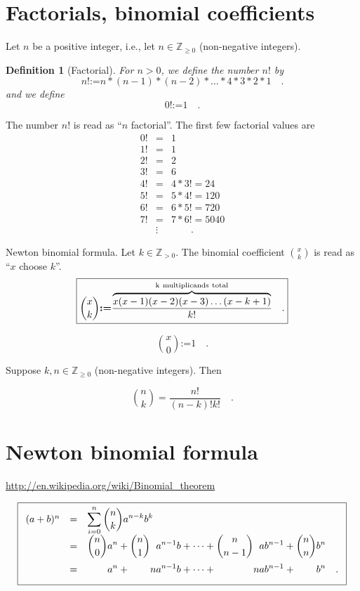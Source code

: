 \documentclass[12pt]{book}
\newcommand{\eqdef}{\textbf{:=}}
\newcommand{\importantFormula}[1]{\begin{equation} \boxed{#1} \end{equation}}
\newtheorem{definition}[theorem]{Definition}
\begin{document}
\section{Factorials, binomial coefficients}\label{secFactorial}
Let $n$ be a positive integer, i.e., let $n \in \mathbb Z_{\geq 0}$ (non-negative integers).
\begin{definition}[Factorial] 
For $n>0$, we define the number $n!$ by
\[
n!\eqdef n*(n-1)*(n-2)*\dots *4*3*2*1 \quad  .
\]
and we define
\[
0!\eqdef 1\quad .
\]
\end{definition}
The number $n!$ is read as ``$n$ factorial''. The first few factorial values are
\[\begin{array}{rcl}
0!&=&1\\
1!&=&1\\
2!&=&2\\
3!&=&6\\
4!&=&4*3!=24\\
5!&=&5*4!=120\\
6!&=&6*5!=720\\
7!&=&7*6!=5040  \\
&\vdots&\quad \quad .
\end{array}
\]

 Newton binomial formula.
 Let $k\in \mathbb Z_{>0}$. The binomial coefficient $\binom{x}{k}$ is read as ``$x$ choose $k$''.
\importantFormula{\label{eqBinomialCoeffDefinition}
\binom{x}{k}\eqdef \frac{ \overbrace{ x(x-1)(x-2)(x-3)\dots (x-k+1)}^{\mathrm{k~multiplicands~total}} } {k!} \quad .
}

\[\binom{x}{0}\eqdef 1 \quad .
\]

Suppose $k,n\in \mathbb Z_{\geq 0}$ (non-negative integers). Then

\[\binom{n}{k} = \frac{n!}{(n-k)! k!}\quad .
\]

\section{Newton binomial formula}\label{secNewtonBinomialReview}
\url{http://en.wikipedia.org/wiki/Binomial_theorem}



\importantFormula{\label{eqNewtonBinomialFormula}
\begin{array}{rcl}
(a+b)^{n} &=&\displaystyle \sum\limits_{i=0}^n \binom {n}{k} a^{n-k}b^{k} \\
&=&\displaystyle \binom{n}{0} a^n + \binom{n}{1}\phantom{n}a^{n-1}b +\dots+ \binom{n}{n-1} \phantom{n} ab^{n-1} + \binom{n}{n} b^n\\
&=&\displaystyle \phantom{\binom{n}{0}}a^n + \phantom{\binom{n}1} n a^{n-1}b+\dots + \phantom{\binom{n}{n-1}} na b^{n-1}+\phantom{\binom{n}{n}} b^n \quad .
\end{array}
}
\end{document}
